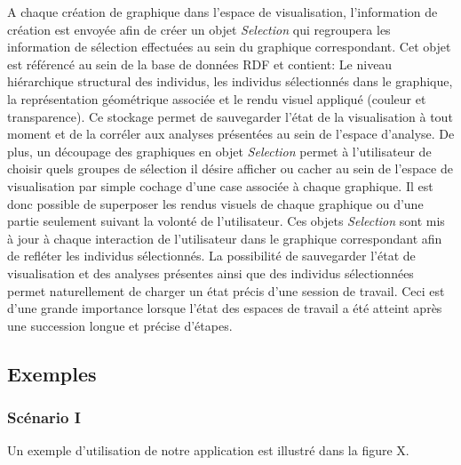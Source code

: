 A chaque création de graphique dans l'espace de visualisation, l'information de création est envoyée afin de créer un objet \textit{Selection} qui regroupera les information de sélection effectuées au sein du graphique correspondant. Cet objet est référencé au sein de la base de données RDF et contient: Le niveau hiérarchique structural des individus, les individus sélectionnés dans le graphique, la représentation géométrique associée et le rendu visuel appliqué (couleur et transparence). Ce stockage permet de sauvegarder l'état de la visualisation à tout moment et de la corréler aux analyses présentées au sein de l'espace d'analyse. De plus, un découpage des graphiques en objet \textit{Selection} permet à l'utilisateur de choisir quels groupes de sélection il désire afficher ou cacher au sein de l'espace de visualisation par simple cochage d'une case associée à chaque graphique. Il est donc possible de superposer les rendus visuels de chaque graphique ou d'une partie seulement suivant la volonté de l'utilisateur. Ces objets \textit{Selection} sont mis à jour à chaque interaction de l'utilisateur dans le graphique correspondant afin de refléter les individus sélectionnés. La possibilité de sauvegarder l'état de visualisation et des analyses présentes ainsi que des individus sélectionnées permet naturellement de charger un état précis d'une session de travail. Ceci est d'une grande importance lorsque l'état des espaces de travail a été atteint après une succession longue et précise d'étapes.

\subsection{Exemples}

\subsubsection{Scénario I}

Un exemple d'utilisation de notre application est illustré dans la figure X.


